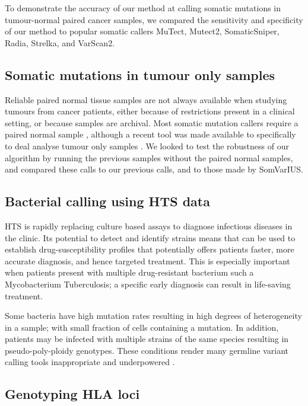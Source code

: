 \documentclass[notitlepage, twocolumn]{article}
\begin{document}
To demonstrate the accuracy of our method at calling somatic mutations in tumour-normal paired cancer samples, we compared the sensitivity and specificity of our method to popular somatic callers MuTect, Mutect2, SomaticSniper, Radia, Strelka, and VarScan2.

\subsection*{Somatic mutations in tumour only samples}

Reliable paired normal tissue samples are not always available when studying tumours from cancer patients, either because of restrictions present in a clinical setting, or because samples are archival. Most somatic mutation callers require a paired normal sample \cite{RN142, RN146, RN150, RN143, RN145}, although a recent tool was made available to specifically to deal analyse tumour only samples \cite{RN161}. We looked to test the robustness of our algorithm by running the previous samples without the paired normal samples, and compared these calls to our previous calls, and to those made by SomVarIUS.

\subsection*{Bacterial calling using HTS data}

HTS is rapidly replacing culture based assays to diagnose infectious diseases in the clinic. Its potential to detect and identify strains means that can be used to establish drug-susceptibility profiles that potentially offers patients faster, more accurate diagnosis, and hence targeted treatment. This is especially important when patients present with multiple drug-resistant bacterium such a Mycobacterium Tuberculosis; a specific early diagnosis can result in life-saving treatment.

Some bacteria have high mutation rates resulting in high degrees of heterogeneity in a sample; with small fraction of cells containing a mutation. In addition, patients may be infected with multiple strains of the same species resulting in pseudo-poly-ploidy genotypes. These conditions render many germline variant calling tools inappropriate and underpowered \cite{RN165}.

\subsection*{Genotyping HLA loci}
\end{document}
